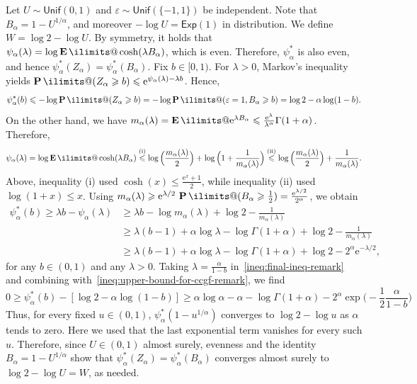 \documentclass[11pt, letterpaper, hidelinks]{article}
\makeatletter
\renewcommand{\proofname}{\textit{\textbf{Proof}}}
\renewenvironment{proof}[1][\proofname]{\par\pushQED{\qed}\normalfont \topsep6\p@\@plus6\p@\relax\trivlist\item[\hskip\labelsep#1\@addpunct{}]\ignorespaces}{\popQED\endtrivlist\@endpefalse}
\newcommand{\e}{\mathrm{e}}
\newcommand{\1}{\mathbf 1}
\newcommand{\half}{\frac12}
\newcommand{\eps}{\varepsilon}
\renewcommand{\ge}{\geqslant}
\renewcommand{\leq}{\leqslant}
\renewcommand{\geq}{\geqslant}
\newcommand{\E}{\operatorname*{\mathbf{E}}\ilimits@}
\renewcommand{\P}{\operatorname*{\mathbf{P}}\ilimits@}
\theoremstyle{plain}
\theoremstyle{definition}
\newcommand{\defn}{=}
\makeatother
\begin{document}
\begin{proof}
Let $U \sim \mathsf{Unif}(0,1)$ and $\eps\sim \mathsf{Unif}(\{-1,1\})$ be independent. Note that $B_\alpha = 1-U^{1/\alpha}$, and moreover $-\log U = \mathsf{Exp}(1)$ in distribution. We define $W = \log 2-\log U$. 
By symmetry, it holds that 
$\psi_\alpha(\lambda)= \log \E \cosh(\lambda B_\alpha)$, which is even. Therefore, $\psi_\alpha^\ast$ is also even, and hence 
$\psi_\alpha^\ast(Z_\alpha)=\psi_\alpha^\ast(B_\alpha)$. Fix $b\in[0,1)$. For $\lambda>0$, Markov's inequality yields $\P(Z_\alpha\geq b )\leq \e^{\psi_\alpha(\lambda)-\lambda b}$. Hence, 
\begin{equation}
\label{ineq:upper-bound-for-ccgf-remark}
\psi_\alpha^\ast(b)\leq -\log \P(Z_\alpha\geq b) 
= -\log \P(\eps = 1, B_\alpha \geq b) = \log 2 - \alpha \log(1-b).
\end{equation}
On the other hand, we have $m_\alpha(\lambda) \defn \E \e^{\lambda B_\alpha} \leq \tfrac{\e^\lambda}{\lambda^\alpha} \Gamma(1+\alpha)$. Therefore, 
\[
\psi_\alpha(\lambda)=\log\E\cosh(\lambda B_\alpha)
\stackrel{{\rm(i)}}{\leq} \log\Big(\frac{m_\alpha(\lambda)}{2}\Big)+\log\Big(1+\frac{1}{m_\alpha(\lambda)}\Big)
\stackrel{{\rm(ii)}}{\leq} \log\Big(\frac{m_\alpha(\lambda)}{2}\Big)+\frac{1}{m_\alpha(\lambda)}.
\]
Above, inequality (i) used $\cosh(x) \leq \tfrac{\e^x + 1}{2}$, while inequality (ii) used $\log(1+x) \leq x$. Using \mbox{$m_\alpha(\lambda) \geq\e^{\lambda/2}\,\P(B_\alpha\ge\tfrac12)
=\tfrac{\e^{\lambda/2}}{2^{\alpha}}$}, we obtain 
\begin{align}
\psi_\alpha^\ast(b) 
\geq \lambda b - \psi_\alpha(\lambda) 
&\geq \lambda b-\log m_\alpha(\lambda)
+\log 2-\frac{1}{m_\alpha(\lambda)} \\ 
&\geq \lambda (b-1) + \alpha \log \lambda - \log \Gamma(1+\alpha) +\log 2-\frac{1}{m_\alpha(\lambda)} \\ 
&\geq 
\lambda (b-1) + \alpha \log \lambda - \log \Gamma(1+\alpha) +\log 2- 2^\alpha \e^{-\lambda/2},
\label{ineq:final-ineq-remark}
\end{align}
for any $b \in (0, 1)$ and any $\lambda > 0$. 
Taking $\lambda = \tfrac{\alpha}{1-b}$  in~\cref{ineq:final-ineq-remark} and combining with~\cref{ineq:upper-bound-for-ccgf-remark}, we find
\[
0 \geq \psi_\alpha^\ast(b)-[
\log 2-\alpha\log(1-b)] \geq \alpha\log\alpha-\alpha-\log\Gamma(1+\alpha)
- 2^\alpha \exp\Big(-\half \frac{\alpha}{1-b}\Big)
\]
Thus, for every fixed $u\in(0,1)$, $\psi_\alpha^\ast(1-u^{1/\alpha})$ converges to $\log 2-\log u$ as $\alpha$ tends to zero. Here we used that the last exponential term vanishes for every such $u$. Therefore, since $U\in(0,1)$ almost surely, evenness and the identity $B_\alpha=1-U^{1/\alpha}$ show that $\psi_\alpha^\ast(Z_\alpha)=\psi_\alpha^\ast(B_\alpha)$ converges almost surely to $\log 2-\log U=W$, as needed.
\end{proof} 
\end{document}
